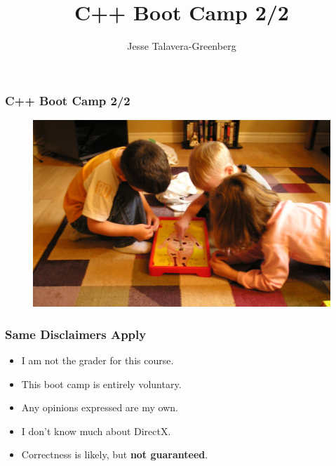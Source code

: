 \documentclass[glossy]{beamer}
\title{C++ Boot Camp 2/2}
\author{Jesse Talavera-Greenberg}
\date{}
\begin{document}
\begin{frame}[fragile=singleslide]
  \frametitle{C++ Boot Camp 2/2}
  \begin{figure}
    \includegraphics[width=.9\columnwidth]{operation}
    \centering
  \end{figure}
\end{frame}


\begin{frame}[fragile=singleslide]
  \frametitle{Same Disclaimers Apply}
  \begin{itemize}
    \item I am not the grader for this course.
    \item This boot camp is entirely voluntary.
    \item Any opinions expressed are my own.
    \item I don't know much about DirectX.
    \item Correctness is likely, but \textbf{not guaranteed}.
  \end{itemize}
\end{frame}

\end{document}
